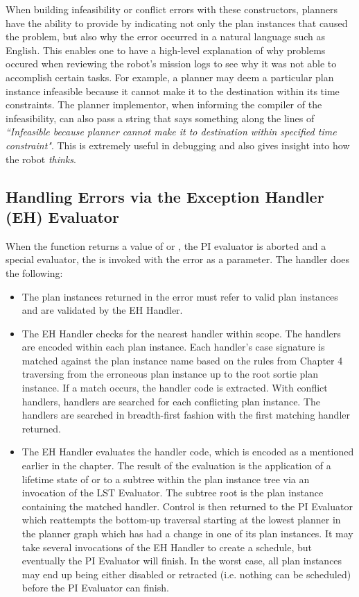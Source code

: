 When building infeasibility or conflict errors with these constructors, planners have the ability to provide  by indicating not only the plan instances that caused the problem, but also why the error occurred in a natural language such as English. This enables one to have a high-level explanation of why problems occured when reviewing the robot's mission logs to see why it was not able to accomplish certain tasks. For example, a  planner may deem a particular  plan instance infeasible because it cannot make it to the destination within its time constraints. The planner implementor, when informing the compiler of the infeasibility, can also pass a string that says something along the lines of \emph{``Infeasible because planner cannot make it to destination within specified time constraint"}. This is extremely useful in debugging and also gives insight into how the robot \textit{thinks}.

\subsection{Handling Errors via the Exception Handler (EH) Evaluator}
When the  function returns a value of  or , the PI evaluator is aborted and a special evaluator, the  is invoked with the error as a parameter. The handler does the following:
\begin{itemize}
\item The plan instances returned in the error must refer to valid plan instances and are validated by the EH Handler.
\item  The EH Handler checks for the nearest handler within scope. The handlers are encoded within each  plan instance. Each handler's case signature is matched against the plan instance name based on the rules from Chapter 4 traversing from the erroneous plan instance up to the root sortie plan instance. If a match occurs, the handler code is extracted. With conflict handlers, handlers are searched for each conflicting plan instance. The handlers are searched in breadth-first fashion with the first matching handler returned.
\item The EH Handler evaluates the handler code, which is encoded as a  mentioned earlier in the chapter. The result of the evaluation is the application of a lifetime state of  or  to a subtree within the plan instance tree via an invocation of the LST Evaluator. The subtree root is the plan instance containing the matched handler.
\Code Control is then returned to the PI Evaluator which reattempts the bottom-up traversal starting at the lowest planner in the planner graph which has had a change in one of its plan instances. It may take several invocations of the EH Handler to create a schedule, but eventually the PI Evaluator will finish. In the worst case, all plan instances may end up being either disabled or retracted (i.e. nothing can be scheduled) before the PI Evaluator can finish.
\end{itemize}

